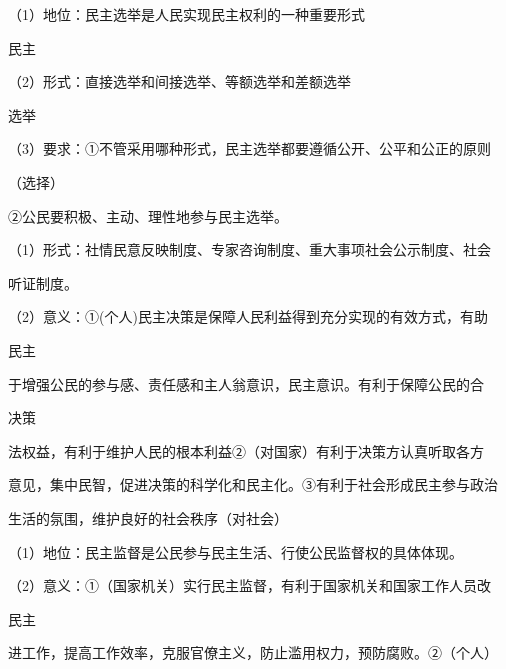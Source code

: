 \documentclass[lang=cn,11pt]{elegantbook}
\newcommand{\daofasym}[1]{{\daofasymbolfont #1}}
\newcommand{\daofasym}[1]{#1}
\begin{document}
（1）地位：民主选举是人民实现民主权利的一种重要形式\par

民主\par

（2）形式：直接选举和间接选举、等额选举和差额选举\par

选举\par

（3）要求：\daofasym{①}不管采用哪种形式，民主选举都要遵循公开、公平和公正的原则\par

（选择）\par

\daofasym{②}公民要积极、主动、理性地参与民主选举。\par

（1）形式：社情民意反映制度、专家咨询制度、重大事项社会公示制度、社会\par

听证制度。\par

（2）意义：\daofasym{①}(个人)民主决策是保障人民利益得到充分实现的有效方式，有助\par

民主\par

于增强公民的参与感、责任感和主人翁意识，民主意识。有利于保障公民的合\par

决策\par

法权益，有利于维护人民的根本利益\daofasym{②}（对国家）有利于决策方认真听取各方\par

意见，集中民智，促进决策的科学化和民主化。\daofasym{③}有利于社会形成民主参与政治\par

生活的氛围，维护良好的社会秩序（对社会）\par

（1）地位：民主监督是公民参与民主生活、行使公民监督权的具体体现。\par

（2）意义：\daofasym{①}（国家机关）实行民主监督，有利于国家机关和国家工作人员改\par

民主\par

进工作，提高工作效率，克服官僚主义，防止滥用权力，预防腐败。\daofasym{②}（个人）\par
\end{document}
